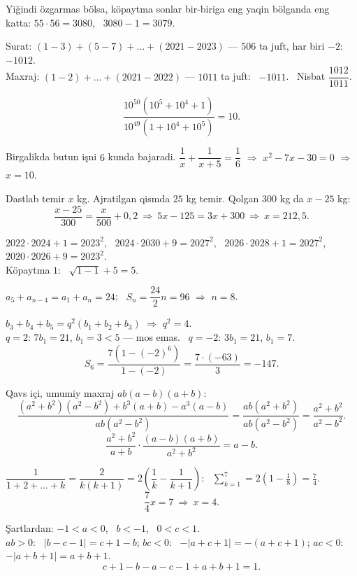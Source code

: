




Yiğindi özgarmas bölsa, köpaytma sonlar bir-biriga eng yaqin bölganda eng katta: $55\cdot56=3080$, \ $3080-1=3079$.

Surat: $(1-3)+(5-7)+\dots+(2021-2023)$ — $506$ ta juft, har biri $-2$: \ $-1012$.\\
Maxraj: $(1-2)+\dots+(2021-2022)$ — $1011$ ta juft: \ $-1011$. \ Nisbat $\dfrac{1012}{1011}$.

\[\frac{10^{50}\left(10^5+10^4+1\right)}{10^{49}\left(1+10^4+10^5\right)}=10.\]

Birgalikda butun işni $6$ kunda bajaradi. $\dfrac1x+\dfrac1{x+5}=\dfrac16$ $\Rightarrow$ $x^2-7x-30=0$ $\Rightarrow$ $x=10$.

Dastlab temir $x$ kg. Ajratilgan qismda $25$ kg temir. Qolgan $300$ kg da $x-25$ kg:
\[\frac{x-25}{300}=\frac x{500}+0{,}2\ \Rightarrow\ 5x-125=3x+300\ \Rightarrow\ x=212{,}5.\]

$2022\cdot2024+1=2023^2$, \ $2024\cdot2030+9=2027^2$, \ $2026\cdot2028+1=2027^2$, \ $2020\cdot2026+9=2023^2$.\\
Köpaytma $1$: \ $\sqrt{1-1}+5=5$.

$a_5+a_{n-4}=a_1+a_n=24$; \ $S_n=\dfrac{24}2n=96$ $\Rightarrow$ $n=8$.

$b_3+b_4+b_5=q^2\left(b_1+b_2+b_3\right)$ $\Rightarrow$ $q^2=4$.\\
$q=2$: $7b_1=21$, $b_1=3<5$ — mos emas. \ $q=-2$: $3b_1=21$, $b_1=7$.
\[S_6=\frac{7\left(1-(-2)^6\right)}{1-(-2)}=\frac{7\cdot(-63)}3=-147.\]

Qavs içi, umumiy maxraj $ab(a-b)(a+b)$:
\[\frac{\left(a^2+b^2\right)\left(a^2-b^2\right)+b^3(a+b)-a^3(a-b)}{ab\left(a^2-b^2\right)}=\frac{ab\left(a^2+b^2\right)}{ab\left(a^2-b^2\right)}=\frac{a^2+b^2}{a^2-b^2}.\]
\[\frac{a^2+b^2}{a+b}\cdot\frac{(a-b)(a+b)}{a^2+b^2}=a-b.\]

$\dfrac1{1+2+\dots+k}=\dfrac2{k(k+1)}=2\left(\dfrac1k-\dfrac1{k+1}\right)$: \ $\displaystyle\sum_{k=1}^7=2\left(1-\frac18\right)=\frac74$.
\[\frac74x=7\ \Rightarrow\ x=4.\]

Şartlardan: $-1<a<0$, \ $b<-1$, \ $0<c<1$.\\
$ab>0$: \ $|b-c-1|=c+1-b$; \quad $bc<0$: \ $-|a+c+1|=-(a+c+1)$; \quad $ac<0$: \ $-|a+b+1|=a+b+1$.
\[c+1-b-a-c-1+a+b+1=1.\]

